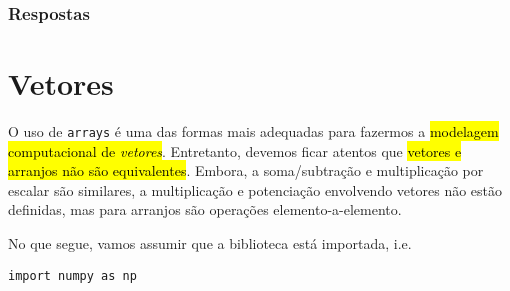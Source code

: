 \ifisbook
\subsubsection{Respostas}
\shipoutAnswer
\fi


\section{Vetores}\label{cap_arr_sec_vetor}

O uso de \texttt{arrays} é uma das formas mais adequadas para fazermos a \hl{modelagem computacional de \emph{vetores}}. Entretanto, devemos ficar atentos que \hl{vetores e arranjos não são equivalentes}. Embora, a soma/subtração e multiplicação por escalar são similares, a multiplicação e potenciação envolvendo vetores não estão definidas, mas para arranjos são operações elemento-a-elemento.

No que segue, vamos assumir que a biblioteca {\numpy} está importada, i.e.

\begin{lstlisting}
import numpy as np
\end{lstlisting}

